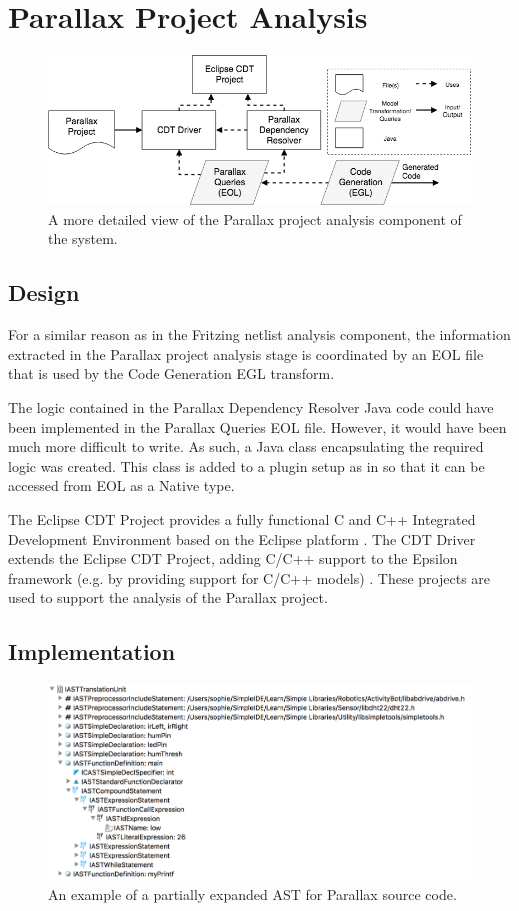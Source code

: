 \documentclass{UoYCSproject}
\begin{document}
\section{Parallax Project Analysis} \label{parallax_design}
\begin{figure}[h!]
  \centering
  \includegraphics[width=0.8\linewidth]{graphics/parallax_project_analysis.png}
  \caption{A more detailed view of the Parallax project analysis component of the system.}
  \label{fig:parallax_analysis}
\end{figure}

\subsection{Design}
For a similar reason as in the Fritzing netlist analysis component, the information extracted in the Parallax project analysis stage is coordinated by an EOL file that is used by the Code Generation EGL transform. 

The logic contained in the Parallax Dependency Resolver Java code could have been implemented in the Parallax Queries EOL file. However, it would have been much more difficult to write. As such, a Java class encapsulating the required logic was created. This class is added to a plugin setup as in \parencite{eol_tool} so that it can be accessed from EOL as a Native type.

The Eclipse CDT Project provides a fully functional C and C++ Integrated Development Environment based on the Eclipse platform \parencite{eclipse_cdt}. The CDT Driver extends the Eclipse CDT Project, adding C/C++ support to the Epsilon framework (e.g. by providing support for C/C++ models) \parencite{cdt_driver}. These projects are used to support the analysis of the Parallax project.

\subsection{Implementation}
\begin{figure}[h!]
  \centering
  \includegraphics[width=0.8\linewidth]{graphics/ast_diagram.png}
  \caption{An example of a partially expanded AST for Parallax source code.}
  \label{fig:ast_diagram}
\end{figure}
\end{document}
